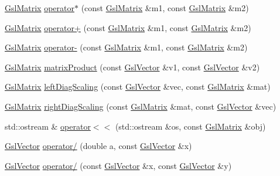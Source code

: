 \begin{DoxyCompactItemize}
\item 
\hyperlink{class_q_u_e_s_o_1_1_gsl_matrix}{Gsl\-Matrix} \hyperlink{namespace_q_u_e_s_o_a511d0179f61e084b7574c97affcbd723}{operator$\ast$} (const \hyperlink{class_q_u_e_s_o_1_1_gsl_matrix}{Gsl\-Matrix} \&m1, const \hyperlink{class_q_u_e_s_o_1_1_gsl_matrix}{Gsl\-Matrix} \&m2)
\item 
\hyperlink{class_q_u_e_s_o_1_1_gsl_matrix}{Gsl\-Matrix} \hyperlink{namespace_q_u_e_s_o_a299d5db0d04a1d1a943b292585d01ad9}{operator+} (const \hyperlink{class_q_u_e_s_o_1_1_gsl_matrix}{Gsl\-Matrix} \&m1, const \hyperlink{class_q_u_e_s_o_1_1_gsl_matrix}{Gsl\-Matrix} \&m2)
\item 
\hyperlink{class_q_u_e_s_o_1_1_gsl_matrix}{Gsl\-Matrix} \hyperlink{namespace_q_u_e_s_o_a07502ec763e41daf33325dfbda9b0102}{operator-\/} (const \hyperlink{class_q_u_e_s_o_1_1_gsl_matrix}{Gsl\-Matrix} \&m1, const \hyperlink{class_q_u_e_s_o_1_1_gsl_matrix}{Gsl\-Matrix} \&m2)
\item 
\hyperlink{class_q_u_e_s_o_1_1_gsl_matrix}{Gsl\-Matrix} \hyperlink{namespace_q_u_e_s_o_aea04e232d5d3dd76349a85bb8acf9e17}{matrix\-Product} (const \hyperlink{class_q_u_e_s_o_1_1_gsl_vector}{Gsl\-Vector} \&v1, const \hyperlink{class_q_u_e_s_o_1_1_gsl_vector}{Gsl\-Vector} \&v2)
\item 
\hyperlink{class_q_u_e_s_o_1_1_gsl_matrix}{Gsl\-Matrix} \hyperlink{namespace_q_u_e_s_o_a0d18267f571a86516c0d9960b1a0f1c9}{left\-Diag\-Scaling} (const \hyperlink{class_q_u_e_s_o_1_1_gsl_vector}{Gsl\-Vector} \&vec, const \hyperlink{class_q_u_e_s_o_1_1_gsl_matrix}{Gsl\-Matrix} \&mat)
\item 
\hyperlink{class_q_u_e_s_o_1_1_gsl_matrix}{Gsl\-Matrix} \hyperlink{namespace_q_u_e_s_o_a2c87d8c1ab55355226086522f9fb7f83}{right\-Diag\-Scaling} (const \hyperlink{class_q_u_e_s_o_1_1_gsl_matrix}{Gsl\-Matrix} \&mat, const \hyperlink{class_q_u_e_s_o_1_1_gsl_vector}{Gsl\-Vector} \&vec)
\item 
std\-::ostream \& \hyperlink{namespace_q_u_e_s_o_acf137d0e0d62509c7abc70f1f0f799ef}{operator$<$$<$} (std\-::ostream \&os, const \hyperlink{class_q_u_e_s_o_1_1_gsl_matrix}{Gsl\-Matrix} \&obj)
\item 
\hyperlink{class_q_u_e_s_o_1_1_gsl_vector}{Gsl\-Vector} \hyperlink{namespace_q_u_e_s_o_a583c7692c136ba44beb81f031d8d55fc}{operator/} (double a, const \hyperlink{class_q_u_e_s_o_1_1_gsl_vector}{Gsl\-Vector} \&x)
\item 
\hyperlink{class_q_u_e_s_o_1_1_gsl_vector}{Gsl\-Vector} \hyperlink{namespace_q_u_e_s_o_ac34d69017fbfb253ed76d20ef53c6f81}{operator/} (const \hyperlink{class_q_u_e_s_o_1_1_gsl_vector}{Gsl\-Vector} \&x, const \hyperlink{class_q_u_e_s_o_1_1_gsl_vector}{Gsl\-Vector} \&y)

\end{DoxyCompactItemize}
